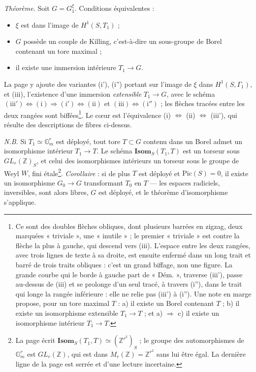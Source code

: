 \documentclass[11pt,a4paper]{article}
\begin{document}
\emph{Théorème.} Soit $G = G_1^{\xi}$. Conditions équivalentes :
\begin{itemize}
\item[(i)] $\xi$ est dans l'image de $H^1(S,T_1)$ ;
\item[(ii)] $G$ possède un couple de Killing, c'est-à-dire un sous-groupe de
Borel contenant un tore maximal ;
\item[(iii')] il existe une immersion intérieure $T_1 \to G$.
\end{itemize}
La page y ajoute des variantes (i'), (i'') portant sur l'image de $\xi$ dans
$H^1(S,\Gamma_1)$, et (iii), l'existence d'une immersion \emph{extensible}
$T_1 \to G$, avec le schéma $(\mathrm{iii'}) \Leftrightarrow (\mathrm{i})
\Rightarrow (\mathrm{i'}) \Leftrightarrow (\mathrm{ii})$ et $(\mathrm{iii})
\Leftrightarrow (\mathrm{i''})$ ; les flèches tracées entre les deux rangées
sont biffées\footnote{Ce sont des doubles flèches obliques, dont plusieurs barrées
en zigzag, deux marquées « triviale », une « inutile » ; le premier « triviale »
est contre la flèche la plus à gauche, qui descend vers (iii). L'espace entre les
deux rangées, avec trois lignes de texte à sa droite, est ensuite enfermé dans un
long trait et barré de trois traits obliques : c'est un grand biffage, non une
figure. La grande courbe qui le borde à gauche part de
« Dém. », traverse (iii'), passe au-dessus de (iii) et se prolonge d'un seul
tracé, à travers (i''), dans le trait qui longe la rangée inférieure : elle ne
relie pas (iii') à (i''). Une note en marge propose, pour un tore maximal
$T$ : a) il existe un Borel contenant $T$ ; b) il existe un isomorphisme
extensible $T_1 \to T$ ; et a) $\Rightarrow$ c) il existe un isomorphisme
intérieur $T_1 \to T$.}. Le cœur est l'équivalence (i) $\Leftrightarrow$ (ii)
$\Leftrightarrow$ (iii'), qui résulte des descriptions de fibres ci-dessus.

\emph{N.B.} Si $T_1 \simeq \mathbb{G}_m^r$ est déployé, tout tore $T \subset G$
contenu dans un Borel admet un isomorphisme intérieur $T_1 \to T$. Le schéma
$\mathbf{Isom}_S(T_1,T)$ est un torseur sous $GL_r(\mathbb{Z})_S$, et celui des
isomorphismes intérieurs un torseur sous le groupe de Weyl $W$, fini
étale\footnote{La page écrit $\mathbf{Isom}_S(T_1,T) \simeq (\mathbb{Z}^{r^2})_S$ ;
le groupe des automorphismes de $\mathbb{G}_m^r$ est $GL_r(\mathbb{Z})$, qui est
dans $M_r(\mathbb{Z}) = \mathbb{Z}^{r^2}$ sans lui être égal. La dernière ligne de
la page est serrée et d'une lecture incertaine.}. \emph{Corollaire} : si de plus
$T$ est déployé et $\mathrm{Pic}(S) = 0$, il existe un isomorphisme $G_0 \to G$
transformant $T_0$ en $T$ — les espaces radiciels, inversibles, sont alors
libres, $G$ est déployé, et le théorème d'isomorphisme s'applique.
\end{document}
